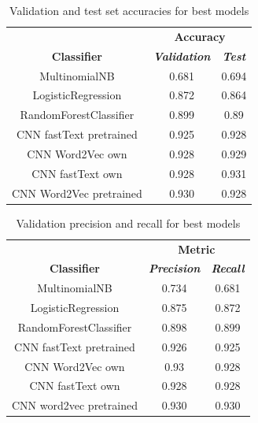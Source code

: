 \documentclass[conference]{IEEEtran}
\begin{document}
\begin{table}[htbp]
\caption{Validation and test set accuracies for best models}
\begin{center}
\begin{tabular}{|c|c|c|}
\hline
\textbf{}&\multicolumn{2}{|c|}{\textbf{Accuracy}} \\ 
\cline{2-3}
\textbf{Classifier} & \textbf{\textit{Validation}}& \textbf{\textit{Test}} \\ 
\hline
MultinomialNB & 0.681 & 0.694 \\ 
\hline
LogisticRegression & 0.872 & 0.864 \\ 
\hline
RandomForestClassifier & 0.899 & 0.89 \\ 
\hline
CNN fastText pretrained & 0.925 & 0.928 \\ 
\hline
CNN Word2Vec own & 0.928 & 0.929 \\ 
\hline
CNN fastText own & 0.928 & 0.931 \\ 
\hline
CNN Word2Vec pretrained & 0.930 & 0.928 \\ 
\hline
\end{tabular}
\label{tab1}
\end{center}
\end{table}

\begin{table}[htbp]
\caption{Validation precision and recall for best models}
\begin{center}
\begin{tabular}{|c|c|c|}
\hline
\textbf{}&\multicolumn{2}{|c|}{\textbf{Metric}} \\ 
\cline{2-3}
\textbf{Classifier} & \textbf{\textit{Precision}}& \textbf{\textit{Recall}} \\ 
\hline
MultinomialNB & 0.734 & 0.681 \\ 
\hline
LogisticRegression & 0.875 & 0.872 \\ 
\hline
RandomForestClassifier & 0.898 & 0.899 \\ 
\hline
CNN fastText pretrained & 0.926 & 0.925 \\ 
\hline
CNN Word2Vec own & 0.93 & 0.928 \\ 
\hline
CNN fastText own & 0.928 & 0.928 \\ 
\hline
CNN word2vec pretrained & 0.930 & 0.930 \\ 
\hline
\end{tabular}
\label{tab2}
\end{center}
\end{table}
\end{document}
